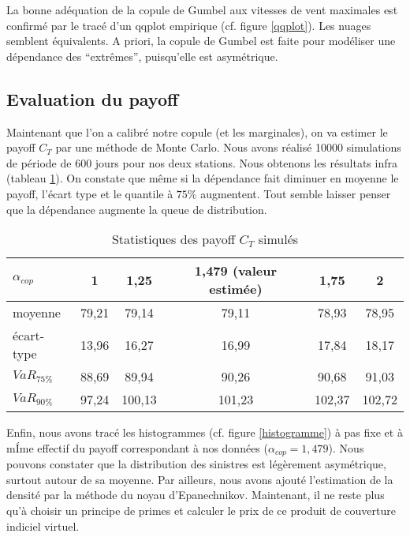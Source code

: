 \documentclass[11pt]{article}
\begin{document}
La bonne ad\'equation de la copule de Gumbel aux vitesses de vent maximales est confirm\'e
par le trac\'e d'un qqplot empirique (cf. figure \ref{qqplot}). Les nuages semblent \'equivalents.
A priori, la copule de Gumbel est faite pour mod\'eliser une d\'ependance des ``extr\^emes'', puisqu'elle
est asym\'etrique.

\subsection{Evaluation du payoff}
Maintenant que l'on a calibr\'e notre copule (et les marginales), on va estimer le payoff $C_T$ par une m\'ethode
de Monte Carlo. Nous avons r\'ealis\'e 10000 simulations de p\'eriode de 600 jours pour nos deux stations. Nous obtenons
les r\'esultats infra (tableau \ref{payoff}). On constate que m\^eme si la d\'ependance fait diminuer en moyenne le payoff,
l'\'ecart type et le quantile \`a $75\%$ augmentent. Tout semble laisser penser que la d\'ependance augmente
la queue de distribution.
\begin{table}[!htb]
\center
\begin{tabular}{lccccc}
\hline
$\alpha_{cop}$ & 1 & 1,25 & 1,479 (valeur estim\'ee) & 1,75 & 2\\
\hline
moyenne & 79,21 & 79,14 & 79,11 & 78,93 & 78,95 \\
\hline
\'ecart-type & 13,96 & 16,27 & 16,99 & 17,84 & 18,17\\
\hline
$VaR_{75\%}$ & 88,69 & 89,94 & 90,26 & 90,68 & 91,03\\
\hline
$VaR_{90\%}$ & 97,24 & 100,13 & 101,23 & 102,37 & 102,72\\
\hline
\end{tabular}
\caption{Statistiques des payoff $C_T$ simul\'es}
\label{payoff}
\end{table}


Enfin, nous avons trac\'e les histogrammes (cf. figure \ref{histogramme}) \`a pas fixe et \`a mÍme effectif du payoff correspondant
\`a nos donn\'ees ($\alpha_{cop}= 1,479 $). Nous pouvons constater que la distribution
des sinistres est l\'eg\`erement asym\'etrique, surtout autour de sa moyenne. Par ailleurs, nous avons ajout\'e
l'estimation de la densit\'e par la m\'ethode du noyau d'Epanechnikov. Maintenant, il ne reste plus qu'\`a choisir
un principe de primes et calculer le prix de ce produit de couverture indiciel virtuel.
\end{document}
